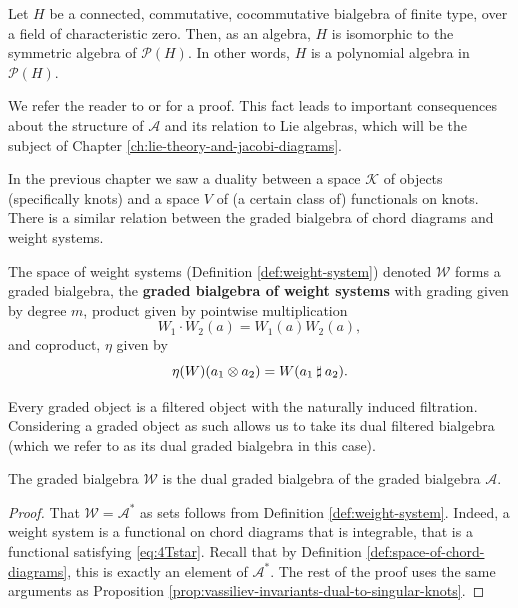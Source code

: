\begin{theorem}
	Let \(H\) be a connected, commutative, cocommutative bialgebra of finite type, over a field of characteristic zero. Then, as an algebra, \(H\) is isomorphic to the symmetric algebra of \(\mathcal{P}(H)\). In other words, \(H\) is a polynomial algebra in \(\mathcal{P}(H)\).
\end{theorem}

We refer the reader to \cite{invariants-of-links-and-3-manifolds-from-graph-configurations} or \cite{introduction-to-vassiliev-invariants} for a proof. This fact leads to important consequences about the structure of \(\mathcal{A}\) and its relation to Lie algebras, which will be the subject of Chapter \ref{ch:lie-theory-and-jacobi-diagrams}.

In the previous chapter we saw a duality between a space \(\mathcal{K}\) of objects (specifically knots) and a space \(V\) of (a certain class of) functionals on knots. There is a similar relation between the graded bialgebra of chord diagrams and weight systems.

\begin{definition}
	The space of weight systems (Definition \ref{def:weight-system}) denoted \(\mathcal{W}\) forms a graded bialgebra, the \textbf{graded bialgebra of weight systems} with grading given by degree \(m\), product given by pointwise multiplication
	\[W_{1}\cdot W_{2}(a) = W_{1}(a)W_{2}(a),\]
	and coproduct, \(\eta\) given by
	\[\eta(W)(a_{1} \otimes a_{2}) = W(a_{1} \mathbin{\sharp} a_{2}).\]
\end{definition}

Every graded object is a filtered object with the naturally induced filtration. Considering a graded object as such allows us to take its dual filtered bialgebra (which we refer to as its dual graded bialgebra in this case).

\begin{proposition}
	The graded bialgebra \(\mathcal{W}\) is the dual graded bialgebra of the graded bialgebra \(\mathcal{A}\).
\end{proposition}

\begin{proof}
	That \(\mathcal{W} = \mathcal{A}^{\ast}\) as sets follows from Definition \ref{def:weight-system}. Indeed, a weight system is a functional on chord diagrams that is integrable, that is a functional satisfying \ref{eq:4Tstar}. Recall that by Definition \ref{def:space-of-chord-diagrams}, this is exactly an element of \(\mathcal{A}^{\ast}\). The rest of the proof uses the same arguments as Proposition \ref{prop:vassiliev-invariants-dual-to-singular-knots}.
\end{proof}

